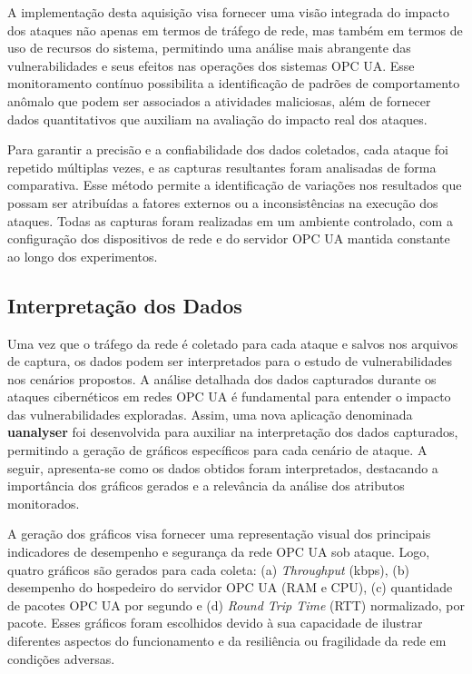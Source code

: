     A implementação desta aquisição visa fornecer uma visão integrada do impacto dos ataques não apenas em termos de tráfego de rede, mas também em termos de uso de recursos do sistema, permitindo uma análise mais abrangente das vulnerabilidades e seus efeitos nas operações dos sistemas OPC UA. Esse monitoramento contínuo possibilita a identificação de padrões de comportamento anômalo que podem ser associados a atividades maliciosas, além de fornecer dados quantitativos que auxiliam na avaliação do impacto real dos ataques.

    Para garantir a precisão e a confiabilidade dos dados coletados, cada ataque foi repetido múltiplas vezes, e as capturas resultantes foram analisadas de forma comparativa. Esse método permite a identificação de variações nos resultados que possam ser atribuídas a fatores externos ou a inconsistências na execução dos ataques. Todas as capturas foram realizadas em um ambiente controlado, com a configuração dos dispositivos de rede e do servidor OPC UA mantida constante ao longo dos experimentos.

    \subsection{Interpretação dos Dados}

    Uma vez que o tráfego da rede é coletado para cada ataque e salvos nos arquivos de captura, os dados podem ser interpretados para o estudo de vulnerabilidades nos cenários propostos.  A análise detalhada dos dados capturados durante os ataques cibernéticos em redes OPC UA é fundamental para entender o impacto das vulnerabilidades exploradas. Assim, uma nova aplicação denominada \textbf{uanalyser} foi desenvolvida para auxiliar na interpretação dos dados capturados, permitindo a geração de gráficos específicos para cada cenário de ataque. A seguir, apresenta-se como os dados obtidos foram interpretados, destacando a importância dos gráficos gerados e a relevância da análise dos atributos monitorados.

    A geração dos gráficos visa fornecer uma representação visual dos principais indicadores de desempenho e segurança da rede OPC UA sob ataque. Logo, quatro gráficos são gerados para cada coleta: (a) \textit{Throughput} (kbps), (b) desempenho do hospedeiro do servidor OPC UA (RAM e CPU), (c) quantidade de pacotes OPC UA por segundo e (d) \textit{Round Trip Time} (RTT) normalizado, por pacote. Esses gráficos foram escolhidos devido à sua capacidade de ilustrar diferentes aspectos do funcionamento e da resiliência ou fragilidade da rede em condições adversas.

